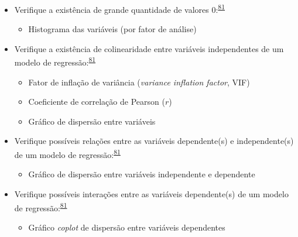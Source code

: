 \documentclass[
  a4paper,
]{book}
\providecommand{\tightlist}{%
  \setlength{\itemsep}{0pt}\setlength{\parskip}{0pt}}
\begin{document}
\begin{itemize}
\item
  Verifique a existência de grande quantidade de valores 0:\textsuperscript{\protect\hyperlink{ref-zuur2009}{81}}

  \begin{itemize}
  \tightlist
  \item
    Histograma das variáveis (por fator de análise)
  \end{itemize}
\end{itemize}

\begin{itemize}
\item
  Verifique a existência de colinearidade entre variáveis independentes de um modelo de regressão:\textsuperscript{\protect\hyperlink{ref-zuur2009}{81}}

  \begin{itemize}
  \item
    Fator de inflação de variância (\emph{variance inflation factor}, VIF)
  \item
    Coeficiente de correlação de Pearson (\(r\))
  \item
    Gráfico de dispersão entre variáveis
  \end{itemize}
\end{itemize}

\begin{itemize}
\item
  Verifique possíveis relações entre as variáveis dependente(s) e independente(s) de um modelo de regressão:\textsuperscript{\protect\hyperlink{ref-zuur2009}{81}}

  \begin{itemize}
  \tightlist
  \item
    Gráfico de dispersão entre variáveis independente e dependente
  \end{itemize}
\end{itemize}

\begin{itemize}
\item
  Verifique possíveis interações entre as variáveis dependente(s) de um modelo de regressão:\textsuperscript{\protect\hyperlink{ref-zuur2009}{81}}

  \begin{itemize}
  \tightlist
  \item
    Gráfico \emph{coplot} de dispersão entre variáveis dependentes
  \end{itemize}
\end{itemize}
\end{document}
